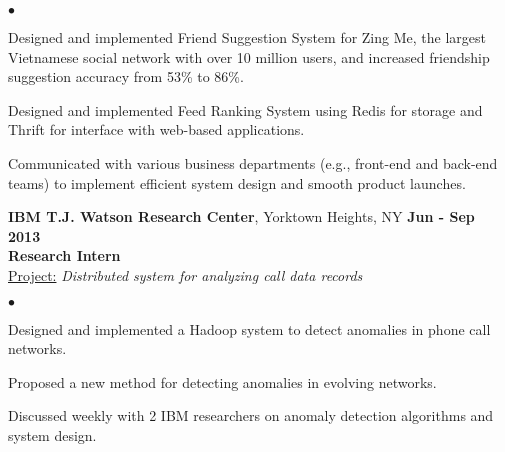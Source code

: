 \documentclass[margin,line]{res}
\newenvironment{list2}{
  \begin{list}{$\bullet$}{%
      \setlength{\itemsep}{0in}
      \setlength{\parsep}{0in} \setlength{\parskip}{0in}
      \setlength{\topsep}{0in} \setlength{\partopsep}{0in} 
      \setlength{\leftmargin}{0.2in}}}{\end{list}}
\begin{document}
\begin{resume}
\begin{list2}
\item Designed and implemented Friend Suggestion System for Zing Me, the largest Vietnamese social network with over 10 million users, and increased friendship suggestion accuracy from 53\% to 86\%.
\item Designed and implemented Feed Ranking System using Redis for storage and Thrift for interface with web-based applications.
\item Communicated with various business departments (e.g., front-end and back-end teams) to implement efficient system design and smooth product launches.
\end{list2}
\vspace*{-0.05in}
{\bf IBM T.J. Watson Research Center}, Yorktown Heights, NY  \hfill {\bf Jun - Sep 2013}
\\{\bf Research Intern}
\\\underline{Project:} {\em Distributed system for analyzing call data records}
\begin{list2}
\item Designed and implemented a Hadoop system to detect anomalies in phone call networks.
\item Proposed a new method for detecting anomalies in evolving networks.
\item Discussed weekly with 2 IBM researchers on anomaly detection algorithms and system design.
\end{list2}
\vspace*{-0.05in}

\end{resume}
\end{document}

